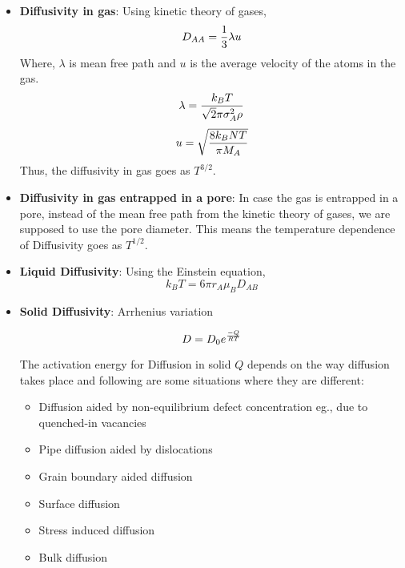 \begin{itemize}
\item \textbf{Diffusivity in gas}: Using kinetic theory of gases,
$$D_{AA} = {1 \over 3} \lambda u$$
Where, $\lambda$ is mean free path and $u$ is the average velocity of the atoms
in the gas.
$$\lambda = {k_B T \over \sqrt{2} \pi \sigma_A^2 \rho}$$
$$ u = \sqrt{8 k_B N T \over \pi M_A}$$
Thus, the diffusivity in gas goes as $T^{3/2}$.

\item \textbf{Diffusivity in gas entrapped in a pore}: In case the gas is
entrapped in a pore, instead of the mean free path from the kinetic theory of
gases, we are supposed to use the pore diameter. This means the temperature
dependence of Diffusivity goes as $T^{1/2}$.

\item \textbf{Liquid Diffusivity}: Using the Einstein equation,
$$k_B T = 6 \pi r_A \mu_B D_{AB}$$

\item \textbf{Solid Diffusivity}: Arrhenius variation

$$ D  = D_0 e^{-Q \over RT} $$

The activation energy for Diffusion in solid $Q$ depends on the way diffusion
takes place and following are some situations where they are different:

\begin{itemize}
\item Diffusion aided by non-equilibrium defect concentration eg., due to
quenched-in vacancies
\item Pipe diffusion aided by dislocations
\item Grain boundary aided diffusion
\item Surface diffusion
\item Stress induced diffusion
\item Bulk diffusion
\end{itemize}

\end{itemize}



